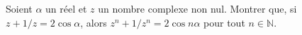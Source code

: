 Soient $\alpha$ un réel et $z$ un nombre complexe non nul. Montrer que, si $z + 1/z = 2\cos\alpha$, alors $z^n + 1/z^n = 2\cos n\alpha$ pour tout $n \in \mathbb{N}$.
